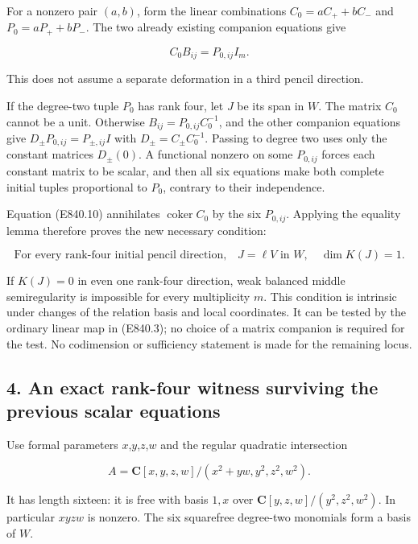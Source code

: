 For a nonzero pair \((a,b)\), form the linear combinations
\(C_0=aC_++bC_-\) and \(P_0=aP_++bP_-\). The two already existing
companion equations give

\[
                         C_0B_{ij}=P_{0,ij}I_m.
 \tag{E840.10}
\]

This does not assume a separate deformation in a third pencil direction.

If the degree-two tuple \(P_0\) has rank four, let \(J\) be its span in
\(W\). The matrix \(C_0\) cannot be a unit. Otherwise
\(B_{ij}=P_{0,ij}C_0^{-1}\), and the other companion equations give
\(D_\pm P_{0,ij}=P_{\pm,ij}I\) with \(D_\pm=C_\pm C_0^{-1}\). Passing to
degree two uses only the constant matrices \(D_\pm(0)\). A functional
nonzero on some \(P_{0,ij}\) forces each constant matrix to be scalar,
and then all six equations make both complete initial tuples
proportional to \(P_0\), contrary to their independence.

Equation (E840.10) annihilates \(\operatorname{coker}C_0\) by the six
\(P_{0,ij}\). Applying the equality lemma therefore proves the new
necessary condition:

\[
 \boxed{\text{For every rank-four initial pencil direction,}
        \quad J=\ell V\text{ in }W,
        \quad\dim K(J)=1.}
 \tag{E840.11}
\]

If \(K(J)=0\) in even one rank-four direction, weak balanced middle
semiregularity is impossible for every multiplicity \(m\). This
condition is intrinsic under changes of the relation basis and local
coordinates. It can be tested by the ordinary linear map in (E840.3); no
choice of a matrix companion is required for the test. No codimension or
sufficiency statement is made for the remaining locus.

\subsection{4. An exact rank-four witness surviving the previous scalar
equations}\label{SF-E840:an-exact-rank-four-witness-surviving-the-previous-scalar-equations}

Use formal parameters \(x\),\(y\),\(z\),\(w\) and the regular quadratic
intersection

\[
 A=\mathbf C[x,y,z,w]/(x^2+yw,y^2,z^2,w^2).
 \tag{E840.12}
\]

It has length sixteen: it is free with basis \(1,x\) over
\(\mathbf C[y,z,w]/(y^2,z^2,w^2)\). In particular \(xyzw\) is nonzero.
The six squarefree degree-two monomials form a basis of \(W\).

